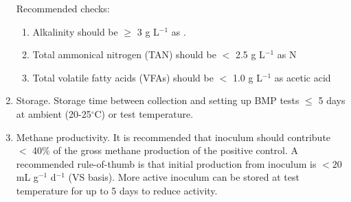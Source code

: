 \begin{enumerate}
    Recommended checks:
    \begin{enumerate}
      \item Alkalinity should be $\ge$ 3 g L$^{-1}$ as .
      \item Total ammonical nitrogen (TAN) should be $<$ 2.5 g L$^{-1}$ as N
      \item Total volatile fatty acids (VFAs) should be $<$ 1.0 g L$^{-1}$ as acetic acid
    \end{enumerate}
  \item Storage. Storage time between collection and setting up BMP tests $\le$ 5 days at ambient (20-25$^\circ$C) or test temperature.
  \item Methane productivity.
    It is recommended that inoculum should contribute $<$ 40\% of the gross methane production of the positive control. 
    A recommended rule-of-thumb is that initial  production from inoculum is $< 20$ mL g$^{-1}$ d$^{-1}$ (VS basis).
    More active inoculum can be stored at test temperature for up to 5 days to reduce activity.

\end{enumerate}


